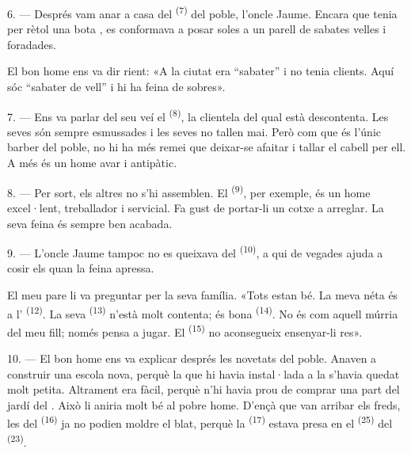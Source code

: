 6. --- Després vam anar a casa del  \textsuperscript{(7)} del
poble, l'oncle Jaume. Encara que tenia per rètol una bota , es
conformava a posar soles a un parell de sabates velles i foradades.

El bon home ens va dir rient: «A la ciutat era “sabater” i no tenia clients. Aquí
sóc “sabater de vell” i hi ha feina de sobres».

7. --- Ens va parlar del seu veí el  \textsuperscript{(8)}, la
clientela del qual està descontenta. Les seves  són sempre
esmussades i les seves  no tallen mai. Però com que és l'únic
barber del poble, no hi ha més remei que deixar-se afaitar i tallar el cabell per
ell. A més és un home avar i antipàtic.

8. --- Per sort, els altres  no s'hi assemblen. El 
\textsuperscript{(9)}, per exemple, és un home excel·lent, treballador i
servicial. Fa gust de portar-li un cotxe a arreglar. La seva feina és sempre ben
acabada.

9. --- L'oncle Jaume tampoc no es queixava del 
\textsuperscript{(10)}, a qui de vegades ajuda a cosir els  quan la
feina apressa.

El meu pare li va preguntar per la seva família. «Tots estan bé. La meva néta és
a l' \textsuperscript{(12)}. La seva 
\textsuperscript{(13)} n'està molt contenta; és bona 
\textsuperscript{(14)}. No és com aquell múrria del meu fill; només pensa a
jugar. El  \textsuperscript{(15)} no aconsegueix ensenyar-li res».

\VUsaut{3.0mm}
\VUsaut{3.0mm}

10. --- El bon home ens va explicar després les novetats del poble. Anaven a
construir una escola nova, perquè la que hi havia instal·lada a la  s'havia quedat molt petita. Altrament era fàcil, perquè n'hi havia prou
de comprar una part del jardí del . Això li aniria molt bé al
pobre home. D'ençà que van arribar els freds, les  del 
\textsuperscript{(16)} ja no podien moldre el blat, perquè la 
\textsuperscript{(17)} estava presa en el  \textsuperscript{(25)} del
 \textsuperscript{(23)}.

